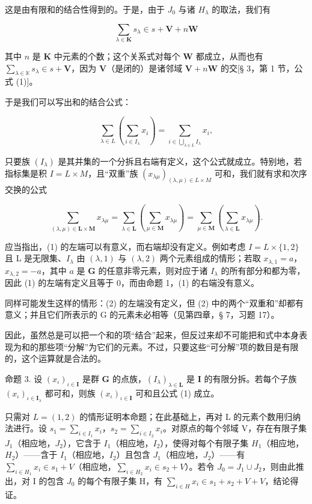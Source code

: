 这是由有限和的结合性得到的。于是，由于 \(J_{0}\) 与诸 \(H_{\lambda}\) 的取法，我们有

\[
\sum_ {\lambda \in \mathbf {K}} s _ {\lambda} \in s + \mathbf {V} + n \mathbf {W}
\]

其中 \(n\) 是 \(\mathbf{K}\) 中元素的个数；这个关系式对每个 \(\mathbf{W}\) 都成立，从而也有 \(\sum_{\lambda \in \mathbb{K}} s_{\lambda} \in s + \mathbf{V}\)，因为 \(\mathbf{V}\)（是闭的）是诸邻域 \(\mathbf{V} + n\mathbf{W}\) 的交{[}§ 3，第 1 节，公式 (1){]}。

于是我们可以写出和的结合公式：

\[
\sum_ {\lambda \in L} (\sum_ {i \in I _ {\lambda}} x _ {i}) = \sum_ {i \in \bigcup_ {\lambda \in L} I _ {\lambda}} x _ {i},\tag{1}
\]

只要族 \((I_{\lambda})\) 是其并集的一个分拆且右端有定义，这个公式就成立。特别地，若指标集是积 \(I = L \times M\)，且“双重”族 \((x_{\lambda\mu})_{(\lambda,\mu) \in L \times M}\) 可和，我们就有求和次序交换的公式

\[
\sum_ {(\lambda , \mu) \in \mathbf {L} \times \mathbf {M}} x _ {\lambda \mu} = \sum_ {\lambda \in \mathbf {L}} (\sum_ {\mu \in \mathbf {M}} x _ {\lambda \mu}) = \sum_ {\mu \in \mathbf {M}} (\sum_ {\lambda \in \mathbf {L}} x _ {\lambda \mu}).\tag{2}
\]

应当指出，(1) 的左端可以有意义，而右端却没有定义。例如考虑 \(I = L \times \{1, 2\}\) 且 L 是无限集、\(I_{\lambda}\) 由 \((\lambda, 1)\) 与 \((\lambda, 2)\) 两个元素组成的情形；若取 \(x_{\lambda,1} = a\)，\(x_{\lambda,2} = -a\)，其中 \(a\) 是 \(\mathbf{G}\) 的任意非零元素，则对应于诸 \(I_{\lambda}\) 的所有部分和都为零，因此 (1) 的左端有定义且等于 0，而由命题 1，(1) 的右端没有意义。

同样可能发生这样的情形：(2) 的左端没有定义，但 (2) 中的两个“双重和”却都有意义；并且它们所表示的 G 的元素未必相等（见第四章，§ 7，习题 17）。

因此，虽然总是可以把一个和的项“结合”起来，但反过来却不可能把和式中本身表现为和的那些项“分解”为它们的元素。不过，只要这些“可分解”项的数目是有限的，这个运算就是合法的。

命题 3. 设 \((x_{\iota})_{\iota \in \mathbf{I}}\) 是群 \(\mathbf{G}\) 的点族，\((I_{\lambda})_{\lambda \in \mathbf{L}}\) 是 \(\mathbf{I}\) 的有限分拆。若每个子族 \((x_{\iota})_{\iota \in \mathbf{I}_{\lambda}}\) 都可和，则族 \((x_{\iota})_{\iota \in \mathbf{I}}\) 可和且公式 (1) 成立。

只需对 \(L = (1,2)\) 的情形证明本命题；在此基础上，再对 L 的元素个数用归纳法进行。设 \(s_{1} = \sum_{i \in I_{1}} x_{i}\)，\(s_{2} = \sum_{i \in I_{2}} x_{i}\)。对原点的每个邻域 V，存在有限子集 \(J_{1}\)（相应地，\(J_{2}\)），它含于 \(I_{1}\)（相应地，\(I_{2}\)），使得对每个有限子集 \(H_{1}\)（相应地，\(H_{2}\)）——含于 \(I_{1}\)（相应地，\(I_{2}\)）且包含 \(J_{1}\)（相应地，\(J_{2}\)）——有 \(\sum_{i \in H_{1}} x_{i} \in s_{1} + V\)（相应地，\(\sum_{i \in H_{2}} x_{i} \in s_{2} + V\)）。若令 \(J_{0} = J_{1} \cup J_{2}\)，则由此推出，对 I 的包含 \(J_{0}\) 的每个有限子集 H，有 \(\sum_{i \in H} x_{i} \in s_{1} + s_{2} + V + V\)，结论得证。

